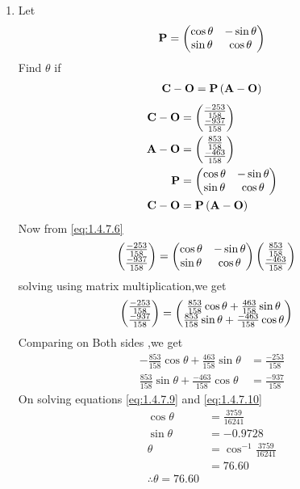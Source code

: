 \documentclass[11pt]{book}
\begin{document}
\begin{enumerate}[label=\thesection.\arabic*.,ref=\thesection.\theenumi]
\item Let 
\begin{align}
\mathbf{P} = \begin{pmatrix}\cos \theta & -\sin \theta \\ \sin \theta & \cos \theta\end{pmatrix}
\end{align}
Find $\theta$ if 
\begin{align}
\mathbf{C}-\mathbf{O}=\mathbf{P}\left(\mathbf{A}-\mathbf{O}\right)
\end{align}
\solution
\begin{align}
    \vec{C}-\vec{O}
          & =\myvec{\frac{-253}{158}\\\frac{-937}{158}}\\
\vec{A}-\vec{O}
         & =\myvec{\frac{853}{158}\\\frac{-463}{158}}
	  \\
\vec{P} &= \myvec{\cos \theta & -\sin \theta \\ \sin \theta & \cos \theta} \\
   \vec{C}-\vec{O}&=\vec{P}\brak{\vec{A}-\vec{O}} \label{eq:1.4.7.6}
\end{align}
 Now from \eqref{eq:1.4.7.6}
 \begin{align}
 \begin{pmatrix}\frac{-253}{158}\\\frac{-937}{158}\end{pmatrix}&= \begin{pmatrix}\cos \theta & -\sin \theta \\ \sin \theta & \cos \theta\end{pmatrix} \begin{pmatrix}\frac{853}{158}\\\frac{-463}{158}\end{pmatrix}    
 \end{align}
solving using matrix multiplication,we get
\begin{align}
    \begin{pmatrix}\frac{-253}{158}\\\frac{-937}{158}\end{pmatrix}&=\begin{pmatrix} \frac{853}{158}\cos\theta + \frac{463}{158}\sin\theta \\ \frac{853}{158}\sin\theta + \frac{-463}{158}\cos\theta\end{pmatrix}
\end{align}
Comparing on Both sides ,we get
\begin{align}
     -\frac{853}{158}\cos\theta + \frac{463}{158}\sin\theta &= \frac{-253}{158}   \label{eq:1.4.7.9}\\
 \frac{853}{158}\sin\theta + \frac{-463}{158}\cos\theta &= \frac{-937}{158} \label{eq:1.4.7.10}
\end{align}
On solving equations \eqref{eq:1.4.7.9}  and \eqref{eq:1.4.7.10}
\begin{align}
    \cos\theta&= \frac{3759}{16241} \\
    \sin\theta&= -0.9728 \\
    \theta &=\cos^{-1}\frac{3759}{16241} \\
            &= 76.60 \\
            \therefore \theta = 76.60
\end{align}
\end{enumerate}
\end{document}
